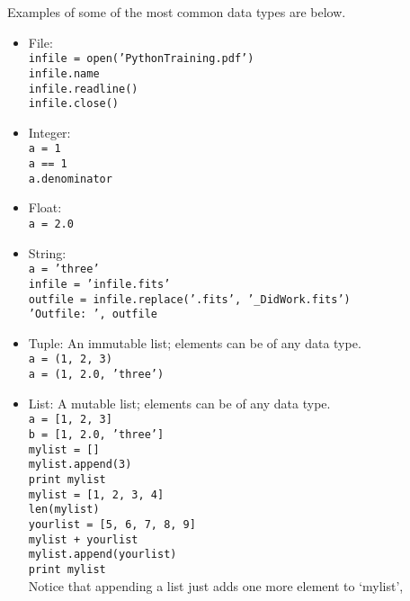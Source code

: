 Examples of some of the most common data types are below.
\begin{itemize}
\item File: \\
  \texttt{\pytab infile = open('PythonTraining.pdf')} \\
  \texttt{\pytab infile.name} \\
  \texttt{\pytab infile.readline()}  \\
  \texttt{\pytab infile.close()}  
\item Integer: \\
 \texttt{\pytab a = 1} \\
 \texttt{\pytab a == 1}  \\
 \texttt{\pytab a.denominator}
\item Float: \\
  \texttt{\pytab a = 2.0}
\item String:  \\
  \texttt{\pytab a = 'three'} \\
  \texttt{\pytab infile = 'infile.fits'} \\
  \texttt{\pytab outfile = infile.replace('.fits', '\_DidWork.fits')} \\
  \texttt{\pytab 'Outfile: ', outfile} 
\item Tuple: An immutable list; elements can be of any data type. \\
  \texttt{\pytab a = (1, 2, 3)}  \\
  \texttt{\pytab a = (1, 2.0, 'three')}
\item List: A mutable list; elements can be of any data type. \\
  \texttt{\pytab a = [1, 2, 3]}  \\
  \texttt{\pytab b = [1, 2.0, 'three']}  \\
  \texttt{\pytab mylist = [] }  \\
  \texttt{\pytab mylist.append(3) } \\
  \texttt{\pytab print mylist } \\
  \texttt{\pytab mylist = [1, 2, 3, 4] } \\
  \texttt{\pytab len(mylist)} \\
  \texttt{\pytab yourlist = [5, 6, 7, 8, 9] } \\
  \texttt{\pytab mylist + yourlist }  \\
  \texttt{\pytab mylist.append(yourlist) }  \\
  \texttt{\pytab print mylist}  \\
  Notice that appending a list just adds one more element to `mylist',

\end{itemize}
